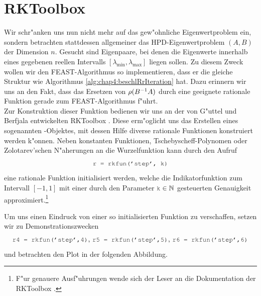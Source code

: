 \section{RKToolbox}

Wir schr"anken uns nun nicht mehr auf das gew"ohnliche Eigenwertproblem ein, sondern betrachten stattdessen allgemeiner das HPD-Eigenwertproblem $(A,B)$ der Dimension $n$. Gesucht sind Eigenpaare, bei denen die Eigenwerte innerhalb eines gegebenen reellen Intervalls $[\lambda_{\min}, \lambda_{\max}]$ liegen sollen.
Zu diesem Zweck wollen wir den FEAST-Algorithmus so implementieren, dass er die gleiche Struktur wie Algorithmus \ref{alg:chap4:beschlRrIteration} hat. Dazu erinnern wir uns an den Fakt, dass das Ersetzen von $\rho(B^{-1}A)$ durch eine geeignete rationale Funktion gerade zum FEAST-Algorithmus f"uhrt.\\

Zur Konstruktion dieser Funktion bedienen wir uns an der von G"uttel und Berfjala entwickelten RKToolbox \cite{rkt}. Diese erm"oglicht uns das Erstellen eines sogenannten -Objektes, mit dessen Hilfe diverse rationale Funktionen konstruiert werden k"onnen. Neben konstanten Funktionen, Tschebyscheff-Polynomen oder Zolotarev'schen N"aherungen an die Wurzelfunktion kann durch den Aufruf
\[
\mcode{r = rkfun('step', k)}
\]
eine rationale Funktion  initialisiert werden, welche die Indikatorfunktion zum Intervall $[-1,1]$ mit einer durch den Parameter $\mcode{k}\in\N$ gesteuerten Genauigkeit approximiert.\footnote{F"ur genauere Ausf"uhrungen wende sich der Leser an die Dokumentation der RKToolbox \cite{rkt}.}

\newpage

Um uns einen Eindruck von einer so initialisierten Funktion zu verschaffen, setzen wir zu Demonstrationszwecken
\[
\mcode{r4 = rkfun('step',4)}\text{,  }\mcode{r5 = rkfun('step',5)}\text{,  }
\mcode{r6 = rkfun('step',6)}
\]
und betrachten den Plot in der folgenden Abbildung.

